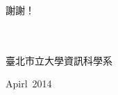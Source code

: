 \begin{acknowledgementsCH}

\setlength{\baselineskip}{1.5em}
謝謝！%
\\
\\
\\


\raggedright{臺北市立大學資訊科學系}

\raggedright{Apirl\ 2014}

\end{acknowledgementsCH}
